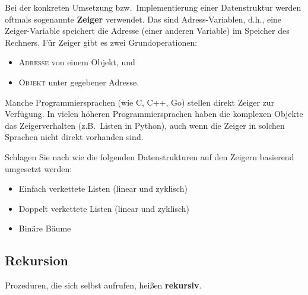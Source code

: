 \begin{bem} 
Bei der konkreten Umsetzung bzw.~Implementierung einer Datenstruktur werden oftmals sogenannte \textbf{Zeiger} verwendet.
Das sind Adress-Variablen, d.h., eine Zeiger-Variable speichert die Adresse (einer anderen Variable) im Speicher des Rechners.
Für Zeiger gibt es zwei Grundoperationen: 
\begin{itemize}
	\item \textsc{Adresse} von einem Objekt, und 
	\item \textsc{Objekt} unter gegebener Adresse.
\end{itemize} 	
Manche Programmiersprachen (wie C, C++, Go) stellen direkt Zeiger zur Verfügung. 
	 In vielen höheren Programmiersprachen haben die komplexen Objekte das Zeigerverhalten (z.B.~Listen in Python), auch wenn die Zeiger in solchen Sprachen nicht direkt vorhanden sind. 
\end{bem} 


\begin{aufg} 
	Schlagen Sie nach wie die folgenden Datenstrukturen auf den Zeigern basierend umgesetzt werden: 
	\begin{itemize}
			\item Einfach verkettete Listen (linear und zyklisch)
			\item Doppelt verkettete Listen  (linear und zyklisch)
			\item Binäre Bäume
	\end{itemize} 
\end{aufg} 

\subsection{Rekursion}


\begin{defn}
	Prozeduren, die sich selbst aufrufen, heißen \textbf{rekursiv}. 
\end{defn} 

